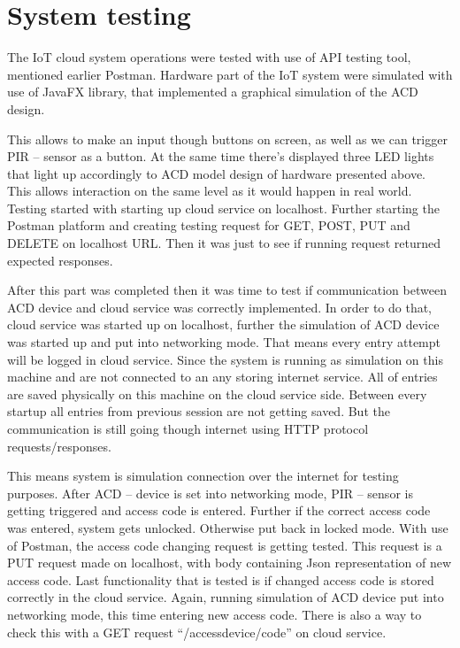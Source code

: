 \section{System testing}
\label{sec:system_testing}

The IoT cloud system operations were tested with use of API testing tool, mentioned earlier Postman. Hardware part of the IoT system were simulated with use of JavaFX library, that implemented a graphical simulation of the ACD design. 

This allows to make an input though buttons on screen, as well as we can trigger PIR – sensor as a button. At the same time there’s displayed three LED lights that light up accordingly to ACD model design of hardware presented above. This allows interaction on the same level as it would happen in real world. 
\newline\newline
Testing started with starting up cloud service on localhost. Further starting the Postman platform and creating testing request for GET, POST, PUT and DELETE on localhost URL. Then it was just to see if running request returned expected responses. 

After this part was completed then it was time to test if communication between ACD device and cloud service was correctly implemented. In order to do that, cloud service was started up on localhost, further the simulation of ACD device was started up and put into networking mode. That means every entry attempt will be logged in cloud service. 
\newline\newline
Since the system is running as simulation on this machine and are not connected to an any storing internet service. All of entries are saved physically on this machine on the cloud service side. Between every startup all entries from previous session are not getting saved. But the communication is still going though internet using HTTP protocol requests/responses. 

This means system is simulation connection over the internet for testing purposes. After ACD – device is set into networking mode, PIR – sensor is getting triggered and access code is entered. Further if the correct access code was entered, system gets unlocked. Otherwise put back in locked mode. 
\newline\newline
With use of Postman, the access code changing request is getting tested. This request is a PUT request made on localhost, with body containing Json representation of new access code. Last functionality that is tested is if changed access code is stored correctly in the cloud service. Again, running simulation of ACD device put into networking mode, this time entering new access code. There is also a way to check this with a GET request “/accessdevice/code” on cloud service. 